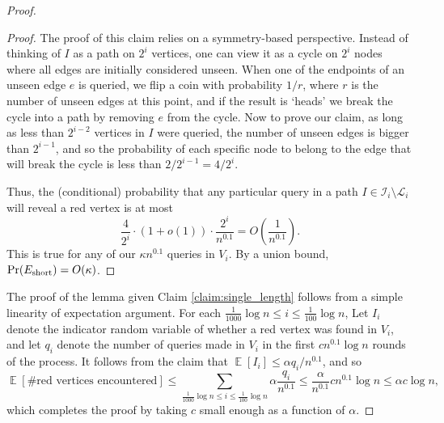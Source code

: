 \documentclass[11pt]{article}
\numberwithin{equation}{section}
\newcommand\E{\mathop{\mathbb E}}
\newcommand{\1}{\mathbf{1}}
\begin{document}
\begin{proof}
\begin{proof}
The proof of this claim relies on a symmetry-based perspective. Instead of thinking of $I$ as a path on $2^{i}$ vertices, one can view it as a cycle on $2^{i}$ nodes where all edges are initially considered unseen. When one of the endpoints of an unseen edge $e$ is queried, we flip a coin with probability $1/r$, where $r$ is the number of unseen edges at this point, and if the result is `heads' we break the cycle into a path by removing $e$ from the cycle. Now to prove our claim, as long as less than $2^{i-2}$ vertices in $I$ were queried, the number of unseen edges is bigger than $2^{i-1}$, and so the probability of each specific node to belong to the edge that will break the cycle is less than $2 / 2^{i-1} = 4 / 2^i$.

Thus, the (conditional) probability that any particular query in a path $I \in \mathcal{I}_i \setminus \mathcal{L}_i$ will reveal a red vertex is at most
$$
\frac{4}{2^i} \cdot (1+o(1)) \cdot \frac{2^i}{n^{0.1}} = O \left(\frac{1}{n^{0.1}} \right).
$$
This is true for any of our $\kappa n^{0.1}$ queries in $V_i$. By a union bound, $\Pr({E_{\text{short}}}) = O(\kappa)$.
\end{proof}

The proof of the lemma given Claim \ref{claim:single_length} follows from a simple linearity of expectation argument.
For each $\frac{1}{1000}  \log n \leq i \leq \frac{1}{100} \log n$, Let $I_i$ denote the indicator random variable of whether a red vertex was found in $V_i$, and let $q_i$ denote the number of queries made in $V_i$ in the first $cn^{0.1} \log n$ rounds of the process. It follows from the claim that $\E[I_i]  \leq \alpha q_i / n^{0.1}$, and so
$$
\E[\text{\# red vertices encountered}] \leq \sum_{\frac{1}{1000}  \log n \leq i \leq \frac{1}{100} \log n} \alpha \frac{q_i}{n^{0.1}} \leq \frac{\alpha}{n^{0.1}} cn^{0.1} \log n \leq \alpha c \log n,
$$
which completes the proof by taking $c$ small enough as a function of $\alpha$.
\end{proof}
\end{document}
